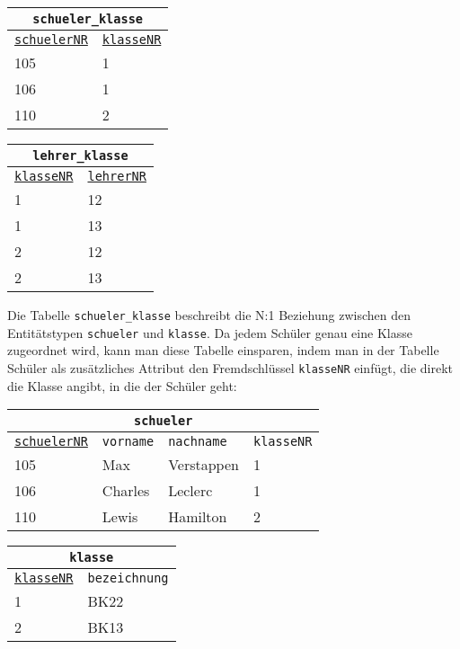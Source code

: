 \begin{minipage}{\textwidth}
	\begin{minipage}{0.5\textwidth}
		\begin{tabular}{ll}
			\multicolumn{2}{c}{\lstinline!schueler_klasse!}\\
			\hline
			\underline{\lstinline!schuelerNR!}&\underline{\lstinline!klasseNR!}\\
			\hline
			105&1\\
			106&1\\
			110&2\\
		\end{tabular}
	\end{minipage}%
	\begin{minipage}{0.5\textwidth}
		\begin{tabular}{ll}
			\multicolumn{2}{c}{\lstinline!lehrer_klasse!}\\
			\hline
			\underline{\lstinline!klasseNR!}&\underline{\lstinline!lehrerNR!}\\
			\hline
			1&12\\
			1&13\\
			2&12\\
			2&13\\
		\end{tabular}
	\end{minipage}%
\end{minipage}
Die Tabelle \lstinline!schueler_klasse! beschreibt die N:1 Beziehung zwischen den Entitätstypen \lstinline!schueler! und \lstinline!klasse!. Da jedem Schüler genau eine Klasse zugeordnet wird, kann man diese Tabelle einsparen, indem man in der Tabelle Schüler als zusätzliches Attribut den Fremdschlüssel \lstinline!klasseNR! einfügt, die direkt die Klasse angibt, in die der Schüler geht:
\begin{minipage}{\textwidth}
	\begin{minipage}{0.6\textwidth}
		\begin{tabular}{llll}
			\multicolumn{4}{c}{\lstinline!schueler!}\\
			\hline
			\underline{\lstinline!schuelerNR!}&\lstinline!vorname!&\lstinline!nachname!&\lstinline!klasseNR!\\
			\hline
			105&Max&Verstappen&1\\
			106&Charles&Leclerc&1\\
			110&Lewis&Hamilton&2\\
		\end{tabular}
	\end{minipage}%
	\begin{minipage}{0.4\textwidth}
		\begin{tabular}{ll}
			\multicolumn{2}{c}{\lstinline!klasse!}\\
			\hline
			\underline{\lstinline!klasseNR!}&\lstinline!bezeichnung!\\
			\hline
			1&BK22\\
			2&BK13\\
		\end{tabular}
	\end{minipage}%
\end{minipage}
